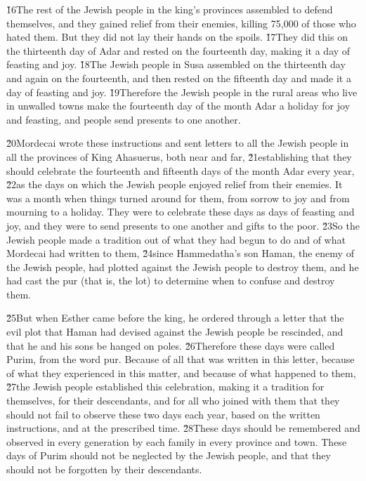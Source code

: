 \v{16}The rest of the Jewish people in the king's provinces assembled to defend themselves, and they gained relief from their enemies, killing 75,000 of those who hated them. But they did not lay their hands on the spoils. \v{17}They did this on the thirteenth day of Adar and rested on the fourteenth day, making it a day of feasting and joy. \v{18}The Jewish people in Susa assembled on the thirteenth day and again on the fourteenth, and then rested on the fifteenth day and made it a day of feasting and joy. \v{19}Therefore the Jewish people in the rural areas who live in unwalled towns make the fourteenth day of the month Adar a holiday for joy and feasting, and people send presents to one another.

\v{20}Mordecai wrote these instructions and sent letters to all the Jewish people in all the provinces of King Ahasuerus, both near and far, \v{21}establishing that they should celebrate the fourteenth and fifteenth days of the month Adar every year, \v{22}as the days on which the Jewish people enjoyed relief from their enemies. It was a month when things turned around for them, from sorrow to joy and from mourning to a holiday. They were to celebrate these days as days of feasting and joy, and they were to send presents to one another and gifts to the poor. \v{23}So the Jewish people made a tradition out of what they had begun to do and of what Mordecai had written to them, \v{24}since Hammedatha's son Haman, the enemy of the Jewish people, had plotted against the Jewish people to destroy them, and he had cast the pur (that is, the lot) to determine when to confuse and destroy them.

\v{25}But when Esther came before the king, he ordered through a letter that the evil plot that Haman had devised against the Jewish people be rescinded, and that he and his sons be hanged on poles. \v{26}Therefore these days were called Purim, from the word pur. Because of all that was written in this letter, because of what they experienced in this matter, and because of what happened to them, \v{27}the Jewish people established this celebration, making it a tradition for themselves, for their descendants, and for all who joined with them that they should not fail to observe these two days each year, based on the written instructions, and at the prescribed time. \v{28}These days should be remembered and observed in every generation by each family in every province and town. These days of Purim should not be neglected by the Jewish people, and that they should not be forgotten by their descendants.

